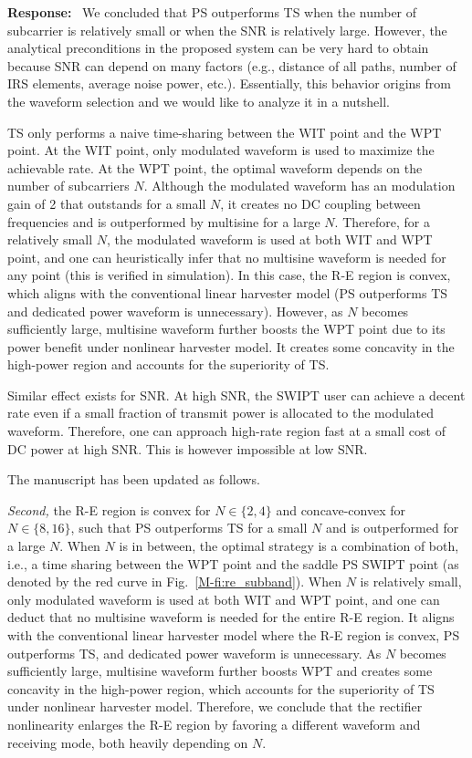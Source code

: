 \documentclass{article}
\newcounter{reviewer}
\newcounter{point}[reviewer]
\newcounter{response}[reviewer]
\newenvironment{response}
	{\refstepcounter{response} \medskip \noindent \textbf{Response:}\ }
	{\medskip}
\begin{document}
\begin{reviewer}
		\begin{response}
			We concluded that PS outperforms TS when the number of subcarrier is relatively small or when the SNR is relatively large. However, the analytical preconditions in the proposed system can be very hard to obtain because SNR can depend on many factors (e.g., distance of all paths, number of IRS elements, average noise power, etc.). Essentially, this behavior origins from the waveform selection and we would like to analyze it in a nutshell.

			TS only performs a naive time-sharing between the WIT point and the WPT point. At the WIT point, only modulated waveform is used to maximize the achievable rate. At the WPT point, the optimal waveform depends on the number of subcarriers $N$. Although the modulated waveform has an modulation gain of \num{2} that outstands for a small $N$, it creates no DC coupling between frequencies and is outperformed by multisine for a large $N$. Therefore, for a relatively small $N$, the modulated waveform is used at both WIT and WPT point, and one can heuristically infer that no multisine waveform is needed for any point (this is verified in simulation). In this case, the R-E region is convex, which aligns with the conventional linear harvester model (PS outperforms TS and dedicated power waveform is unnecessary). However, as $N$ becomes sufficiently large, multisine waveform further boosts the WPT point due to its power benefit under nonlinear harvester model. It creates some concavity in the high-power region and accounts for the superiority of TS.

			Similar effect exists for SNR. At high SNR, the SWIPT user can achieve a decent rate even if a small fraction of transmit power is allocated to the modulated waveform. Therefore, one can approach high-rate region fast at a small cost of DC power at high SNR. This is however impossible at low SNR.

			The manuscript has been updated as follows.
			\begin{framed}
				\emph{Second,} the R-E region is convex for $N \in \{2,4\}$ and concave-convex for $N \in \{8,16\}$, such that PS outperforms TS for a small $N$ and is outperformed for a large $N$. When $N$ is in between, the optimal strategy is a combination of both, i.e., a time sharing between the WPT point and the saddle PS SWIPT point (as denoted by the red curve in Fig.~\ref{M-fi:re_subband}). When $N$ is relatively small, only modulated waveform is used at both WIT and WPT point, and one can deduct that no multisine waveform is needed for the entire R-E region. It aligns with the conventional linear harvester model where the R-E region is convex, PS outperforms TS, and dedicated power waveform is unnecessary. As $N$ becomes sufficiently large, multisine waveform further boosts WPT and creates some concavity in the high-power region, which accounts for the superiority of TS under nonlinear harvester model. Therefore, we conclude that the rectifier nonlinearity enlarges the R-E region by favoring a different waveform and receiving mode, both heavily depending on $N$.
			\end{framed}
		\end{response}


\end{reviewer}
\end{document}
